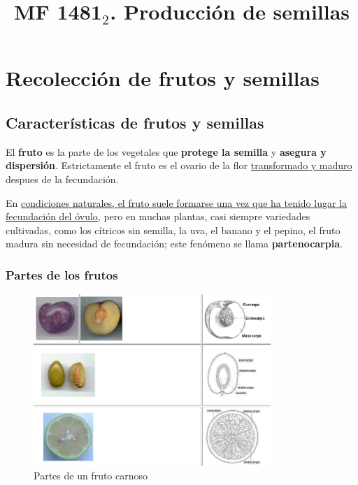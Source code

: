 \documentclass[a4paper,12pt,oneside]{book}
\date{}
\title{MF 1481\(_{\text{2}}\). Producción de semillas}
\begin{document}
\maketitle
\thispagestyle{empty} \tableofcontents \clearpage\chapter{Recolección de frutos y semillas}
\label{sec:orge2e2c4b}
\section{Características de frutos y semillas}
\label{sec:orgc24742b}
El \textbf{fruto} es la parte de los vegetales que \textbf{protege la semilla} y \textbf{asegura y
dispersión}. Estrictamente el fruto es el ovario de la flor \uline{transformado y
maduro} despues de la fecundación.

En \uline{condiciones naturales, el fruto suele formarse una vez que ha tenido lugar 
la fecundación del óvulo}, pero en muchas plantas, casi siempre variedades
cultivadas, como los cítricos sin semilla, la uva, el banano y el pepino, el
fruto madura sin necesidad de fecundación; este fenómeno se llama \textbf{partenocarpia}. 

\subsection{Partes de los frutos}
\label{sec:orgb234e71}
\begin{figure}[htbp]
\centering
\includegraphics[width=0.8\textwidth]{./img_1481/fruto_partes_varios.PNG}
\caption{Partes de un fruto carnoso}
\end{figure}
\end{document}
